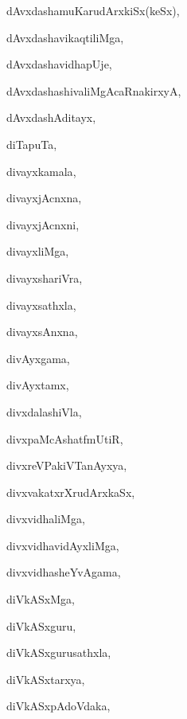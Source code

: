 \begin{multicols}{3}
{\noindent
{dAvxdashamuKarudArxkiSx(keSx)}, \pageref{dAvxdashamuKarudArxkiSxkeSx}

\noindent
{dAvxdashavikaqtiliMga}, \pageref{dAvxdashavikaqtiliMga}

\noindent
{dAvxdashavidhapUje}, \pageref{dAvxdashavidhapUje}

\noindent
{dAvxdashashivaliMgAcaRnakirxyA}, \pageref{dAvxdashashivaliMgAcaRnakirxyA}

\noindent
{dAvxdashAditayx}, \pageref{dAvxdashAditayx}

\noindent
{diTapuTa}, \pageref{diTapuTa}

\noindent
{divayxkamala}, \pageref{divayxkamala}

\noindent
{divayxjAcnxna}, \pageref{divayxjAcnxna}

\noindent
{divayxjAcnxni}, \pageref{divayxjAcnxni}

\noindent
{divayxliMga}, \pageref{divayxliMga}

\noindent
{divayxshariVra}, \pageref{divayxshariVra}

\noindent
{divayxsathxla}, \pageref{divayxsathxla}

\noindent
{divayxsAnxna}, \pageref{divayxsAnxna}

\noindent
{divAyxgama}, \pageref{divAyxgama}

\noindent
{divAyxtamx}, \pageref{divAyxtamx}

\noindent
{divxdalashiVla}, \pageref{divxdalashiVla}

\noindent
{divxpaMcAshatfmUtiR}, \pageref{divxpaMcAshatfmUtiR}

\noindent
{divxreVPakiVTanAyxya}, \pageref{divxreVPakiVTanAyxya}

\noindent
{divxvakatxrXrudArxkaSx}, \pageref{divxvakatxrXrudArxkaSx}

\noindent
{divxvidhaliMga}, \pageref{divxvidhaliMga}

\noindent
{divxvidhavidAyxliMga}, \pageref{divxvidhavidAyxliMga}

\noindent
{divxvidhasheYvAgama}, \pageref{divxvidhasheYvAgama}

\noindent
{diVkASxMga}, \pageref{diVkASxMga}

\noindent
{diVkASxguru}, \pageref{diVkASxguru}

\noindent
{diVkASxgurusathxla}, \pageref{diVkASxgurusathxla}

\noindent
{diVkASxtarxya}, \pageref{diVkASxtarxya}

\noindent
{diVkASxpAdoVdaka}, \pageref{diVkASxpAdoVdaka}

}
\end{multicols}
